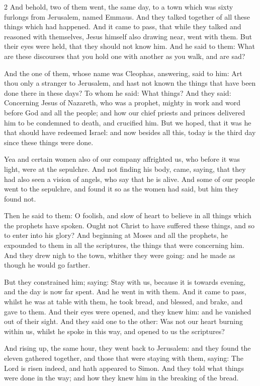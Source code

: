 \begin{multicols}{2}\small
And behold, two of them went, the same day, to a town which was sixty furlongs from Jerusalem, named Emmaus. And they talked together of all these things which had happened. And it came to pass, that while they talked and reasoned with themselves, Jesus himself also drawing near, went with them. But their eyes were held, that they should not know him. And he said to them: What are these discourses that you hold one with another as you walk, and are sad?

And the one of them, whose name was Cleophas, answering, said to him: Art thou only a stranger to Jerusalem, and hast not known the things that have been done there in these days? To whom he said: What things? And they said: Concerning Jesus of Nazareth, who was a prophet, mighty in work and word before God and all the people; and how our chief priests and princes delivered him to be condemned to death, and crucified him. But we hoped, that it was he that should have redeemed Israel: and now besides all this, today is the third day since these things were done.

Yea and certain women also of our company affrighted us, who before it was light, were at the sepulchre. And not finding his body, came, saying, that they had also seen a vision of angels, who say that he is alive. And some of our people went to the sepulchre, and found it so as the women had said, but him they found not.

Then he said to them: O foolish, and slow of heart to believe in all things which the prophets have spoken. Ought not Christ to have suffered these things, and so to enter into his glory? And beginning at Moses and all the prophets, he expounded to them in all the scriptures, the things that were concerning him. And they drew nigh to the town, whither they were going: and he made as though he would go farther.

But they constrained him; saying: Stay with us, because it is towards evening, and the day is now far spent. And he went in with them. And it came to pass, whilst he was at table with them, he took bread, and blessed, and brake, and gave to them. And their eyes were opened, and they knew him: and he vanished out of their sight. And they said one to the other: Was not our heart burning within us, whilst he spoke in this way, and opened to us the scriptures?

And rising up, the same hour, they went back to Jerusalem: and they found the eleven gathered together, and those that were staying with them, saying: The Lord is risen indeed, and hath appeared to Simon. And they told what things were done in the way; and how they knew him in the breaking of the bread. 
\end{multicols}

